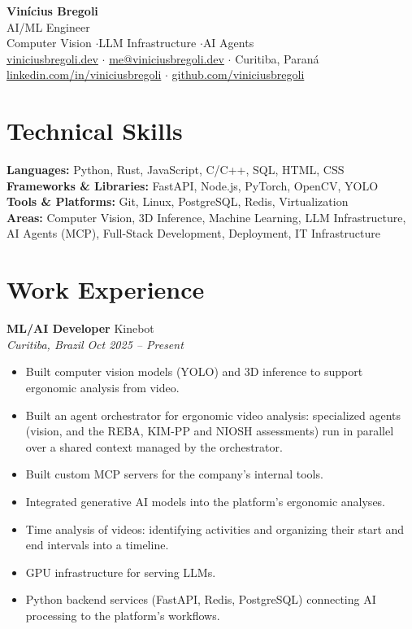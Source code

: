 \documentclass[11pt,a4paper]{article}
\newcommand{\entry}[4]{
    \textbf{#1} \hfill #2 \\
    \textit{#3} \hfill \textit{#4}
}
\begin{document}
\begin{center}
    {\LARGE\bfseries Vinícius Bregoli} \\[4pt]
    AI/ML Engineer \\[1pt]
    Computer Vision \enspace$\cdot$\enspace LLM Infrastructure \enspace$\cdot$\enspace AI Agents \\[6pt]
    \href{https://www.viniciusbregoli.dev}{viniciusbregoli.dev} \enspace$\cdot$\enspace
    \href{mailto:me@viniciusbregoli.dev}{me@viniciusbregoli.dev} \enspace$\cdot$\enspace
    Curitiba, Paraná \\[2pt]
    \href{https://linkedin.com/in/viniciusbregoli/}{linkedin.com/in/viniciusbregoli} \enspace$\cdot$\enspace
    \href{https://github.com/viniciusbregoli}{github.com/viniciusbregoli}
\end{center}

\section{Technical Skills}
\noindent\textbf{Languages:} Python, Rust, JavaScript, C/C++, SQL, HTML, CSS \\
\textbf{Frameworks \& Libraries:} FastAPI, Node.js, PyTorch, OpenCV, YOLO \\
\textbf{Tools \& Platforms:} Git, Linux, PostgreSQL, Redis, Virtualization \\
\textbf{Areas:} Computer Vision, 3D Inference, Machine Learning, LLM Infrastructure, AI Agents (MCP), Full-Stack Development, Deployment, IT Infrastructure

\section{Work Experience}

\entry{ML/AI Developer}{Kinebot}{Curitiba, Brazil}{Oct 2025 -- Present}
\begin{itemize}[nosep, leftmargin=*]
    \item Built computer vision models (YOLO) and 3D inference to support ergonomic analysis from video.
    \item Built an agent orchestrator for ergonomic video analysis: specialized agents (vision, and the REBA, KIM-PP and NIOSH assessments) run in parallel over a shared context managed by the orchestrator.
    \item Built custom MCP servers for the company's internal tools.
    \item Integrated generative AI models into the platform's ergonomic analyses.
    \item Time analysis of videos: identifying activities and organizing their start and end intervals into a timeline.
    \item GPU infrastructure for serving LLMs.
    \item Python backend services (FastAPI, Redis, PostgreSQL) connecting AI processing to the platform's workflows.
\end{itemize}
\end{document}
